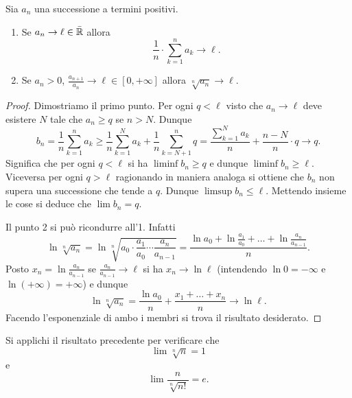 \begin{theorem}
  \label{th:criterio_cesaro}%
  \mymark{*}%
%
  Sia $a_n$ una successione a termini positivi.
  \begin{enumerate}
  \item
    Se
    $   a_n \to \ell \in \bar {{\mathbb R}}$
    allora
    \[
    \frac 1 n \cdot \displaystyle\sum_{k=1}^n a_k \to \ell.
    \]
  
  \item
    Se $a_n>0$,
    $\displaystyle\frac{a_{n+1}}{a_n} \to \ell \in [0,+\infty]$
    allora
    $\displaystyle \sqrt[n]{a_n}\to \ell$.
  \end{enumerate}
  \end{theorem}
  \begin{proof}
  Dimostriamo il primo punto.
  Per ogni $q<\ell$ visto che $a_n\to \ell$ deve esistere $N$ tale che 
  $a_n\ge q$ se $n> N$. 
  Dunque 
  \[
    b_n = \frac 1 n \sum_{k=1}^{n} a_k 
    \ge \frac 1 n \sum_{k=1}^N a_k + \frac 1 n \sum_{k=N+1}^n q 
    = \frac{\sum_{k=1}^N a_k}{n} + \frac{n-N}{n}\cdot q \to q.
  \]
  Significa che per ogni $q<\ell$ si ha $\liminf b_n \ge q$ e 
  dunque $\liminf b_n \ge \ell$.
  Viceversa per ogni $q>\ell$ ragionando in maniera analoga si ottiene 
  che $b_n$ non supera una successione che tende a $q$.
  Dunque $\limsup b_n\le \ell$. 
  Mettendo insieme le cose si deduce che $\lim b_n = q$.
    
  Il punto 2 si può ricondurre all'1.
  Infatti
  \[
    \ln \sqrt[n]{a_n}
    = \ln \sqrt[n]{a_0\cdot \frac{a_1}{a_0} \cdots \frac{a_n}{a_{n-1}}}
    = \frac{\ln a_0 + \ln \frac{a_1}{a_0} + \dots + \ln \frac{a_n}{a_{n-1}}}{n}.
  \]
  Posto $x_n = \ln \frac{a_n}{a_{n-1}}$
  se $\frac{a_n}{a_{n-1}}\to \ell$
  si ha $x_n\to \ln \ell$ (intendendo $\ln 0 = -\infty$ e $\ln (+\infty)=+\infty$) e dunque
  \[
    \ln \sqrt[n]{a_n} = \frac{\ln a_0}{n} + \frac{x_1 + \dots + x_n}{n}
    \to \ln \ell.
  \]
  Facendo l'esponenziale di ambo i membri si trova il risultato desiderato.
  \end{proof}
  
  \begin{exercise}\label{ex:7340098}
  Si applichi il risultato precedente per
  verificare che
  \[
     \lim \sqrt[n]{n} = 1
  \]
 e
 \[
   \lim \frac{n}{\sqrt[n]{n!}} = e.
 \]
 \end{exercise}

